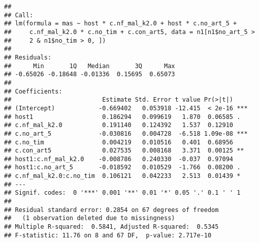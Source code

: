 \documentclass[]{article}
\newenvironment{Shaded}{\begin{snugshade}}{\end{snugshade}}
\newcommand{\KeywordTok}[1]{\textcolor[rgb]{0.13,0.29,0.53}{\textbf{#1}}}
\newcommand{\DataTypeTok}[1]{\textcolor[rgb]{0.13,0.29,0.53}{#1}}
\newcommand{\DecValTok}[1]{\textcolor[rgb]{0.00,0.00,0.81}{#1}}
\newcommand{\StringTok}[1]{\textcolor[rgb]{0.31,0.60,0.02}{#1}}
\newcommand{\OperatorTok}[1]{\textcolor[rgb]{0.81,0.36,0.00}{\textbf{#1}}}
\newcommand{\NormalTok}[1]{#1}
\begin{document}
\begin{verbatim}
## 
## Call:
## lm(formula = mas ~ host * c.nf_mal_k2.0 + host * c.no_art_5 + 
##     c.nf_mal_k2.0 * c.no_tim + c.con_art5, data = n1[n1$no_art_5 > 
##     2 & n1$no_tim > 0, ])
## 
## Residuals:
##      Min       1Q   Median       3Q      Max 
## -0.65026 -0.18648 -0.01336  0.15695  0.65073 
## 
## Coefficients:
##                         Estimate Std. Error t value Pr(>|t|)    
## (Intercept)            -0.669402   0.053918 -12.415  < 2e-16 ***
## host1                   0.186294   0.099619   1.870  0.06585 .  
## c.nf_mal_k2.0           0.191140   0.124392   1.537  0.12910    
## c.no_art_5             -0.030816   0.004728  -6.518 1.09e-08 ***
## c.no_tim                0.004219   0.010516   0.401  0.68956    
## c.con_art5              0.027535   0.008168   3.371  0.00125 ** 
## host1:c.nf_mal_k2.0    -0.008786   0.240330  -0.037  0.97094    
## host1:c.no_art_5       -0.018592   0.010529  -1.766  0.08200 .  
## c.nf_mal_k2.0:c.no_tim  0.106121   0.042233   2.513  0.01439 *  
## ---
## Signif. codes:  0 '***' 0.001 '**' 0.01 '*' 0.05 '.' 0.1 ' ' 1
## 
## Residual standard error: 0.2854 on 67 degrees of freedom
##   (1 observation deleted due to missingness)
## Multiple R-squared:  0.5841, Adjusted R-squared:  0.5345 
## F-statistic: 11.76 on 8 and 67 DF,  p-value: 2.717e-10
\end{verbatim}

\begin{Shaded}
\end{Shaded}
\end{document}
